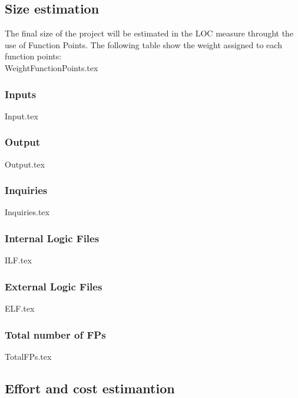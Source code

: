 \subsection{Size estimation}
The final size of the project will be estimated in the  LOC measure throught the use of Function Points.
The following table show the weight assigned to each function points:\\

{WeightFunctionPoints.tex}

\subsubsection{Inputs}

{Input.tex}

\subsubsection{Output}
{Output.tex}

\subsubsection{Inquiries}
{Inquiries.tex}

\subsubsection{Internal Logic Files}
{ILF.tex}

\subsubsection{External Logic Files}
{ELF.tex}

\subsubsection{Total number of FPs}
{TotalFPs.tex}

\subsection{Effort and cost estimantion}

